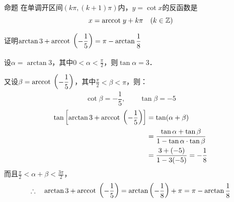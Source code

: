 \begin{blk}{命题}
    在单调开区间$(k\pi ,(k+1)\pi )$内，$y=\cot x$的反函数是
\[x={\rm arccot\; } y+k\pi\quad (k\in\mathbb{Z})\]
\end{blk}


\begin{example}
    证明$\arctan 3+{\rm arccot\; }\left(-\dfrac{1}{5}\right)=\pi-\arctan\dfrac{1}{8}$
\end{example}

\begin{solution}
设$\alpha=\arctan 3$，其中$0<\alpha<\frac{\pi}{2}$，则$\tan\alpha=3$．

又设$\beta={\rm arccot\; }\left(-\dfrac{1}{5}\right)$，其中$\frac{\pi}{2}<\beta<\pi$，则：
\[\cot\beta=-\frac{1}{5},\qquad \tan\beta=-5\]
\[\begin{split}
 \tan\left[\arctan 3+{\rm arccot\; }\left(-\dfrac{1}{5}\right)\right]
&=\tan(\alpha+\beta)\\
&=\dfrac{\tan\alpha+\tan\beta}{1-\tan\alpha\cdot \tan\beta}\\
&=\dfrac{3+(-5)}{1-3(-5)}=-\dfrac{1}{8}
\end{split}\]
而且$\frac{\pi}{2}<\alpha+\beta<\frac{3\pi}{2}$，
\[\therefore\quad \arctan 3+{\rm arccot\; }\left(-\dfrac{1}{5}\right)=\arctan\left(-\dfrac{1}{8}\right)+\pi=\pi-\arctan\dfrac{1}{8}\]
\end{solution}

